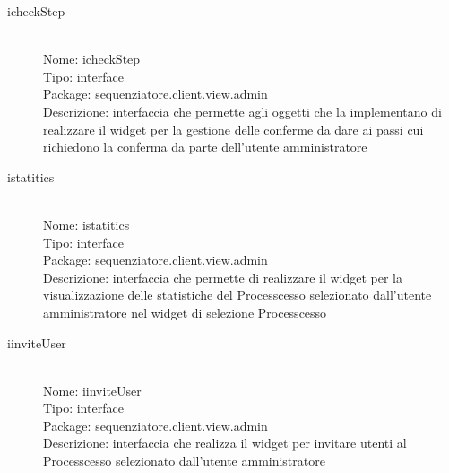 \begin{description}
	\item[icheckStep] 
  	\hfill \\
  	Nome: icheckStep\\
  	Tipo: interface\\
	Package: sequenziatore.client.view.admin\\
	Descrizione: interfaccia che permette agli oggetti che la implementano di realizzare il widget per la gestione delle conferme da dare ai passi cui richiedono la conferma da parte dell'utente amministratore
\end{description}

\begin{description}
	\item[istatitics] 
  	\hfill \\
  	Nome: istatitics\\
  	Tipo: interface\\
	Package: sequenziatore.client.view.admin\\
	Descrizione: interfaccia che permette di realizzare il widget per la visualizzazione delle statistiche del Processcesso selezionato dall'utente amministratore nel widget di selezione Processcesso
\end{description}
\begin{description}
	\item[iinviteUser] 
  	\hfill \\
  	Nome: iinviteUser\\
  	Tipo: interface\\
	Package: sequenziatore.client.view.admin\\
	Descrizione: interfaccia che realizza il widget per invitare utenti al Processcesso selezionato dall'utente amministratore
\end{description}